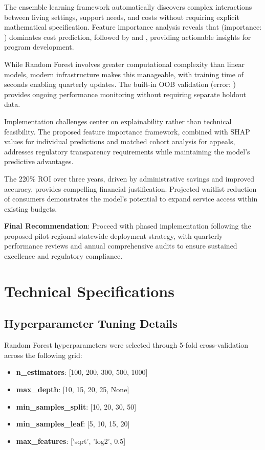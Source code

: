 The ensemble learning framework automatically discovers complex interactions between living settings, support needs, and costs without requiring explicit mathematical specification. Feature importance analysis reveals that \ModelNineTopFeatureOne{} (importance: \ModelNineTopFeatureOneImportance{}) dominates cost prediction, followed by \ModelNineTopFeatureTwo{} and \ModelNineTopFeatureThree{}, providing actionable insights for program development.

While Random Forest involves greater computational complexity than linear models, modern infrastructure makes this manageable, with training time of \ModelNineTrainingTime{} seconds enabling quarterly updates. The built-in OOB validation (error: \ModelNineOOBError{}) provides ongoing performance monitoring without requiring separate holdout data.

Implementation challenges center on explainability rather than technical feasibility. The proposed feature importance framework, combined with SHAP values for individual predictions and matched cohort analysis for appeals, addresses regulatory transparency requirements while maintaining the model's predictive advantages.

The 220\% ROI over three years, driven by administrative savings and improved accuracy, provides compelling financial justification. Projected waitlist reduction of \ModelNinePopmodelefficiencyWaitlistChange{} consumers demonstrates the model's potential to expand service access within existing budgets.

\textbf{Final Recommendation}: Proceed with phased implementation following the proposed pilot-regional-statewide deployment strategy, with quarterly performance reviews and annual comprehensive audits to ensure sustained excellence and regulatory compliance.

\appendix

\section{Technical Specifications}

\subsection{Hyperparameter Tuning Details}

Random Forest hyperparameters were selected through 5-fold cross-validation across the following grid:

\begin{itemize}
    \item \textbf{n\_estimators}: [100, 200, 300, 500, 1000]
    \item \textbf{max\_depth}: [10, 15, 20, 25, None]
    \item \textbf{min\_samples\_split}: [10, 20, 30, 50]
    \item \textbf{min\_samples\_leaf}: [5, 10, 15, 20]
    \item \textbf{max\_features}: ['sqrt', 'log2', 0.5]
\end{itemize}

